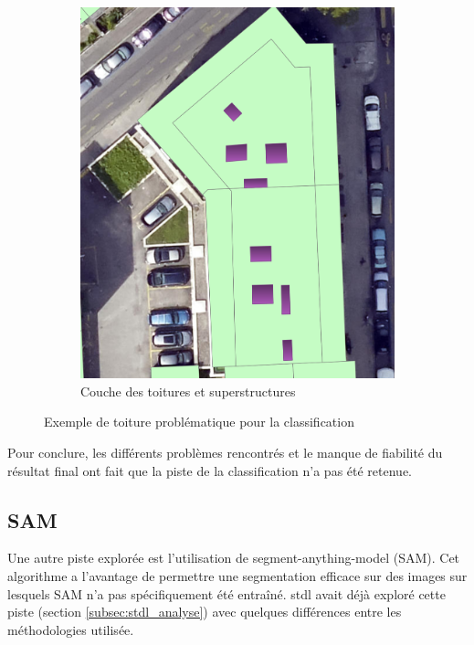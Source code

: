 \begin{figure}[H]
\begin{subfigure}[b]{0.475\textwidth}
        \includegraphics[width=\textwidth]{02-main/figures/ch3_piste_exploree_classification_09_resultats_image__toiture_sp.png}
        \caption{Couche des toitures et superstructures}
        \label{fig:ch3_piste_exploree_classification_09_resultats_image__toiture_sp}
    \end{subfigure}

    \caption{Exemple de toiture problématique pour la classification}
    \label{fig:piste_exploree_classification_resultats_explications}
\end{figure}

Pour conclure, les différents problèmes rencontrés et le manque de fiabilité du résultat final ont fait que la piste de la classification n'a pas été retenue.


\newpage
\subsection{SAM}
Une autre piste explorée est l'utilisation de segment-anything-model (SAM). Cet algorithme a l'avantage de permettre une segmentation efficace sur des images sur lesquels SAM n'a pas spécifiquement été entraîné. \acrshort{stdl} avait déjà exploré cette piste (section \ref{subsec:stdl_analyse}) avec quelques différences entre les méthodologies utilisée.

